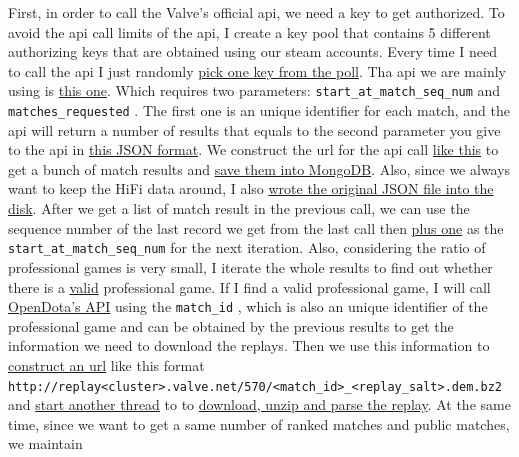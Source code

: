 \documentclass{article}
\newcommand{\codeinline}[1]{
    \texttt{#1}
}
\begin{document}
    First, in order to call the Valve's official api, we need a key to get authorized. To avoid the api call limits of the api, I create a key pool that contains 5 different authorizing keys that are obtained using our steam accounts. Every time I need to call the api I just randomly \href{https://github.com/Vopaaz/big-data-psg-lgd/blob/a9a285e0e29c0d9e56b41994875df830c7e7b51b/src/main/java/FetchStore/ValveAPI.java#L215}{pick one key from the poll}. Tha api we are mainly using is \href{https://wiki.teamfortress.com/wiki/WebAPI/GetMatchHistoryBySequenceNum}{this one}. Which requires two parameters: \codeinline{start_at_match_seq_num} and \codeinline{matches_requested}.
The first one is an unique identifier for each match, and the api will return a number of results that equals to the second parameter you give to the api in \href{https://wiki.teamfortress.com/wiki/WebAPI/GetMatchDetails}{this JSON format}. We construct the url for the api call \href{https://github.com/Vopaaz/big-data-psg-lgd/blob/a9a285e0e29c0d9e56b41994875df830c7e7b51b/src/main/java/FetchStore/ValveAPI.java#L207-L230}{like this} to get a bunch of match results and \href{https://github.com/Vopaaz/big-data-psg-lgd/blob/a9a285e0e29c0d9e56b41994875df830c7e7b51b/src/main/java/FetchStore/ValveAPI.java#L238-L257}{save them into MongoDB}. Also, since we always want to keep the HiFi data around, I also \href{https://github.com/Vopaaz/big-data-psg-lgd/blob/a9a285e0e29c0d9e56b41994875df830c7e7b51b/src/main/java/FetchStore/ValveAPI.java#L289-L300}{wrote the original JSON file into the disk}. After we get a list of match result in the previous call, we can use the sequence number of the last record we get from the last call then \href{https://github.com/Vopaaz/big-data-psg-lgd/blob/a9a285e0e29c0d9e56b41994875df830c7e7b51b/src/main/java/FetchStore/ValveAPI.java#L275}{plus one} as the \codeinline{start_at_match_seq_num} for the next iteration. Also, considering the ratio of professional games is very small, I iterate the whole results to find out whether there is a \href{https://github.com/Vopaaz/big-data-psg-lgd/blob/a9a285e0e29c0d9e56b41994875df830c7e7b51b/src/main/java/FetchStore/ValveAPI.java#L146-L161}{valid} professional game. If I find a valid professional game, I will call \href{https://docs.opendota.com}{OpenDota's API} using the \codeinline{match_id}, which is also an unique identifier of the professional game and can be obtained by the previous results to get the information we need to download the replays. Then we use this information to \href{https://github.com/Vopaaz/big-data-psg-lgd/blob/a9a285e0e29c0d9e56b41994875df830c7e7b51b/src/main/java/FetchStore/OpendotaAPI.java#L17-L70}{construct an url} like this format \codeinline{http://replay<cluster>.valve.net/570/<match_id>_<replay_salt>.dem.bz2} and \href{https://github.com/Vopaaz/big-data-psg-lgd/blob/a9a285e0e29c0d9e56b41994875df830c7e7b51b/src/main/java/FetchStore/ValveAPI.java#L131-L144}{start another thread} to to \href{https://github.com/Vopaaz/big-data-psg-lgd/blob/a9a285e0e29c0d9e56b41994875df830c7e7b51b/src/main/java/FetchStore/ValveAPI.java#L389-L420}{download, unzip and parse the replay}. At the same time, since we want to get a same number of ranked matches and public matches, we maintain 
\end{document}

